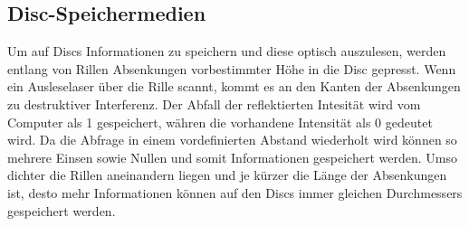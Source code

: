           \FloatBarrier


        \subsection{Disc-Speichermedien}
          Um auf Discs Informationen zu speichern und diese optisch auszulesen, werden entlang von Rillen Absenkungen vorbestimmter Höhe in die Disc gepresst. Wenn ein Ausleselaser über die Rille scannt, kommt
          es an den Kanten der Absenkungen zu destruktiver Interferenz. Der Abfall der reflektierten Intesität wird vom Computer als 1 gespeichert, währen die vorhandene Intensität als 0 gedeutet wird. Da die
          Abfrage in einem vordefinierten Abstand wiederholt wird können so mehrere Einsen sowie Nullen und somit Informationen gespeichert werden. Umso dichter die Rillen aneinandern liegen und je kürzer die
          Länge der Absenkungen ist, desto mehr Informationen können auf den Discs immer gleichen Durchmessers gespeichert werden.



           

